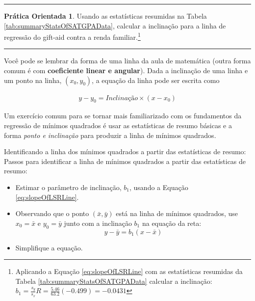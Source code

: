 \documentclass[
]{book}
\theoremstyle{definition}
\theoremstyle{definition}
\theoremstyle{definition}
\newtheorem{exercise}{Prática Orientada}[chapter]
\theoremstyle{definition}
\theoremstyle{remark}
\begin{document}
\begin{center}\rule{0.5\linewidth}{0.5pt}\end{center}

\begin{exercise}
\protect\hypertarget{exr:findingTheSlopeOfTheLSRLineForIncomeAndAid}{}{\label{exr:findingTheSlopeOfTheLSRLineForIncomeAndAid} }Usando as estatísticas resumidas na Tabela \ref{tab:summaryStatsOfSATGPAData}, calcular a inclinação para a linha de regressão do gift-aid contra a renda familiar.\footnote{Aplicando a Equação \eqref{eq:slopeOfLSRLine} com as estatísticas resumidas da Tabela \ref{tab:summaryStatsOfSATGPAData} calcular a inclinação: \(b_1 = \frac{s_y}{s_x} R = \frac{5.46}{63.2}(-0.499) = -0.0431\)}
\end{exercise}

\begin{center}\rule{0.5\linewidth}{0.5pt}\end{center}

Você pode se lembrar da forma de uma linha da aula de matemática (outra forma comum é com \textbf{coeficiente linear e angular}). Dada a inclinação de uma linha e um ponto na linha, \((x_0, y_0)\), a equação da linha pode ser escrita como

\begin{eqnarray}
y - y_0 = Inclinação \times (x - x_0)
\label{eq:pointSlopeFormForALine}
\end{eqnarray}

Um exercício comum para se tornar mais familiarizado com os fundamentos da regressão de mínimos quadrados é usar as estatísticas de resumo básicas e a forma \emph{ponto e inclinação} para produzir a linha de mínimos quadrados.

Identificando a linha dos mínimos quadrados a partir das estatísticas de resumo: Passos para identificar a linha de mínimos quadrados a partir das estatísticas de resumo:

\begin{itemize}
\item
  Estimar o parâmetro de inclinação, \(b_1\), usando a Equação \eqref{eq:slopeOfLSRLine}.
\item
  Observando que o ponto \((\bar{x}, \bar{y})\) está na linha de mínimos quadrados, use \(x_0=\bar{x}\) e \(y_0=\bar{y}\) junto com a inclinação \(b_1\) na equação da reta: \[y - \bar{y} = b_1 (x - \bar{x})\]
\item
  Simplifique a equação.
\end{itemize}
\end{document}
